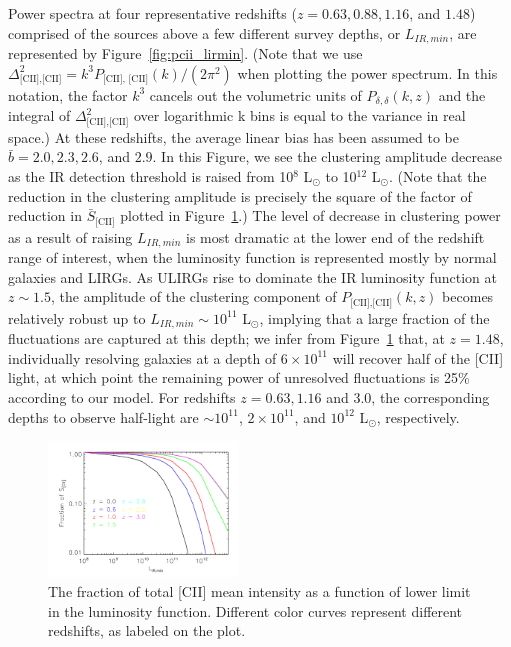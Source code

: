 \documentclass[iop,twocolappendix]{emulateapj}
\begin{document}
Power spectra at four representative redshifts ($z = 0.63, 0.88, 1.16$, and $1.48$) comprised of the sources above a few different survey depths, or  $L_{IR, min}$, are represented by Figure~\ref{fig:pcii_lirmin}. (Note that we use  $\Delta_{\textrm{[CII],[CII]}}^2 = k^3 P_{\textrm{[CII], [CII]}}(k)/(2\pi^2)$ when plotting the power spectrum. In this notation, the factor $k^3$ cancels out the volumetric units of $P_{\delta,\delta}(k,z)$ and the integral of $\Delta_{\textrm{[CII],[CII]}}^2$ over logarithmic k bins is equal to the variance in real space.) At these redshifts, the average linear bias has been assumed to be $\bar{b} = 2.0, 2.3, 2.6$, and $2.9$. In this Figure, we see the clustering amplitude decrease as the IR detection threshold is raised from 10$^{8}$ L$_{\odot}$ to 10$^{12}$ L$_{\odot}$.  (Note that the reduction in the clustering amplitude is precisely the square of the factor of reduction in $\bar{S}_{\textrm{[CII]}}$ plotted in Figure~\ref{fig:frac_cii_b11_lirmin}.) The level of decrease in clustering power as a result of raising $L_{IR,min}$ is most dramatic at the lower end of the redshift range of interest, when the luminosity function is represented mostly by normal galaxies and LIRGs. As ULIRGs rise to dominate the IR luminosity function at $z\sim1.5$, the amplitude of the clustering component of $P_{\textrm{[CII],[CII]}}(k,z)$ becomes relatively robust up to $L_{IR,min} \sim 10^{11}$ L$_{\odot}$, implying that a large fraction of the fluctuations are captured at this depth; we infer from Figure~\ref{fig:frac_cii_b11_lirmin} that, at $z = 1.48$, individually resolving galaxies at a depth of $6\times10^{11}$ will recover half of the [CII] light, at which point the remaining power of unresolved fluctuations is 25\% according to our model. For redshifts $z=0.63, 1.16$ and $3.0$, the corresponding depths to observe half-light are $\sim 10^{11}$, $2\times10^{11}$, and $10^{12}$ L$_{\odot}$, respectively. 

\begin{figure}
\centering
\includegraphics[width=0.45\textwidth]{fraction_cii_emissivity_vs_LIRmin_vs_z}
\caption{The fraction of total [CII] mean intensity as a function of lower limit in the luminosity function. Different color curves represent different redshifts, as labeled on the plot.}
\label{fig:frac_cii_b11_lirmin}
\end{figure}
\end{document}
